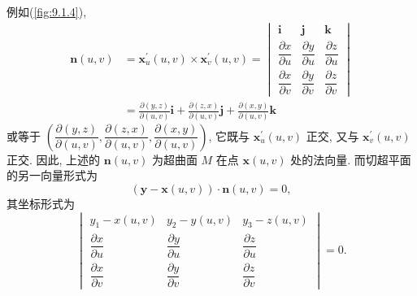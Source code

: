 \begin{example}
例如(\cref{fig:9.1.4}),
\begin{align*}
  \boldsymbol{n}(u,v) &= \boldsymbol{x}_{u}^{\prime}(u,v) \times \boldsymbol{x}_{v}^{\prime}(u,v) = \begin{vmatrix}
    \boldsymbol{i} & \boldsymbol{j} & \boldsymbol{k} \\
    \dfrac{\partial x}{\partial u} & \dfrac{\partial y}{\partial u} & \dfrac{\partial z}{\partial u} \\
    \dfrac{\partial x}{\partial v} & \dfrac{\partial y}{\partial v} & \dfrac{\partial z}{\partial v}
  \end{vmatrix} \\
  &= \frac{\partial(y,z)}{\partial(u,v)}\boldsymbol{i} + \frac{\partial(z,x)}{\partial(u,v)}\boldsymbol{j} + \frac{\partial(x,y)}{\partial(u,v)}\boldsymbol{k}
\end{align*}
或等于 $\left(\dfrac{\partial(y,z)}{\partial(u,v)}, \dfrac{\partial(z,x)}{\partial(u,v)}, \dfrac{\partial(x,y)}{\partial(u,v)}\right)$, 它既与 $\boldsymbol{x}_{u}^{\prime}(u,v)$ 正交, 又与 $\boldsymbol{x}_{v}^{\prime}(u,v)$ 正交. 因此, 上述的 $\boldsymbol{n}(u,v)$ 为超曲面 $M$ 在点 $\boldsymbol{x}(u,v)$ 处的法向量. 而切超平面的另一向量形式为
\[
  (\boldsymbol{y} - \boldsymbol{x}(u,v)) \cdot \boldsymbol{n}(u,v) = 0,
\]
其坐标形式为
\[
  \begin{vmatrix}
    y_{1} - x(u,v) & y_{2} - y(u,v) & y_{3} - z(u,v) \\
    \dfrac{\partial x}{\partial u} & \dfrac{\partial y}{\partial u} & \dfrac{\partial z}{\partial u} \\
    \dfrac{\partial x}{\partial v} & \dfrac{\partial y}{\partial v} & \dfrac{\partial z}{\partial v}
  \end{vmatrix} = 0.
\]
\end{example}

